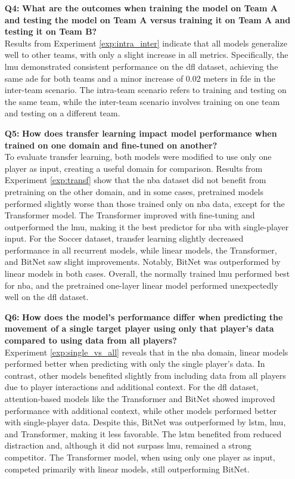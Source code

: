 \begin{itemize}
    \item[\textbf{Q4:}] \textbf{What are the outcomes when training the model on Team A and testing the model on Team A versus training it on Team A and testing it on Team B?}\\
    Results from Experiment \ref{exp:intra_inter} indicate that all models generalize well to other teams, with only a slight increase in all metrics. Specifically, the \gls{lmu} demonstrated consistent performance on the \gls{dfl} dataset, achieving the same \gls{ade} for both teams and a minor increase of 0.02 meters in \gls{fde} in the inter-team scenario. The intra-team scenario refers to training and testing on the same team, while the inter-team scenario involves training on one team and testing on a different team.

    \item[\textbf{Q5:}] \textbf{How does transfer learning impact model performance when trained on one domain and fine-tuned on another?}\\
    To evaluate transfer learning, both models were modified to use only one player as input, creating a useful domain for comparison. Results from Experiment \ref{exp:transf} show that the \gls{nba} dataset did not benefit from pretraining on the other domain, and in some cases, pretrained models performed slightly worse than those trained only on \gls{nba} data, except for the Transformer model. The Transformer improved with fine-tuning and outperformed the \gls{lmu}, making it the best predictor for \gls{nba} with single-player input. For the Soccer dataset, transfer learning slightly decreased performance in all recurrent models, while linear models, the Transformer, and BitNet saw slight improvements. Notably, BitNet was outperformed by linear models in both cases. Overall, the normally trained \gls{lmu} performed best for \gls{nba}, and the pretrained one-layer linear model performed unexpectedly well on the \gls{dfl} dataset.

    \item[\textbf{Q6:}] \textbf{How does the model's performance differ when predicting the movement of a single target player using only that player’s data compared to using data from all players?}\\
    Experiment \ref{exp:single_vs_all} reveals that in the \gls{nba} domain, linear models performed better when predicting with only the single player’s data. In contrast, other models benefited slightly from including data from all players due to player interactions and additional context. For the \gls{dfl} dataset, attention-based models like the Transformer and BitNet showed improved performance with additional context, while other models performed better with single-player data. Despite this, BitNet was outperformed by \gls{lstm}, \gls{lmu}, and Transformer, making it less favorable. The \gls{lstm} benefited from reduced distraction and, although it did not surpass \gls{lmu}, remained a strong competitor. The Transformer model, when using only one player as input, competed primarily with linear models, still outperforming BitNet.
\end{itemize}

